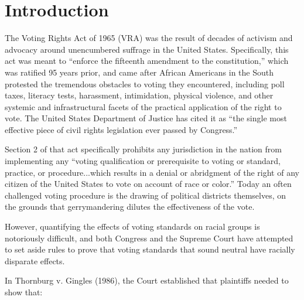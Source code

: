 \documentclass[fleqn,10pt]{style}
\affiliation{\textsuperscript{1}\textit{Departments of Computer Science and Statistics, Harvard University, Cambridge, Massachusetts, United States}} %
\affiliation{hangulu@college.harvard.edu} %
\begin{document}
\flushbottom %

\maketitle %

\tableofcontents %

\thispagestyle{empty} %


\newpage
\section*{Introduction}


The Voting Rights Act of 1965 (VRA)\cite{vra} was the result of decades of activism and advocacy around unencumbered suffrage in the United States. Specifically, this act was meant to “enforce the fifteenth amendment to the constitution,” which was ratified 95 years prior, and came after African Americans in the South protested the tremendous obstacles to voting they encountered, including poll taxes, literacy tests, harassment, intimidation, physical violence, and other systemic and infrastructural facets of the practical application of the right to vote. The United States Department of Justice has cited it as “the single most effective piece of civil rights legislation ever passed by Congress.”\cite{effective}

Section 2 of that act specifically prohibits any jurisdiction in the nation from implementing any “voting qualification or prerequisite to voting or standard, practice, or procedure...which results in a denial or abridgment of the right of any citizen of the United States to vote on account of race or color.” Today an often challenged voting procedure is the drawing of political districts themselves, on the grounds that gerrymandering dilutes the effectiveness of the vote.

However, quantifying the effects of voting standards on racial groups is notoriously difficult, and both Congress and the Supreme Court have attempted to set aside rules to prove that voting standards that sound neutral have racially disparate effects.

In Thornburg v. Gingles (1986)\cite{thornburg}, the Court established that plaintiffs needed to show that:
\end{document}
